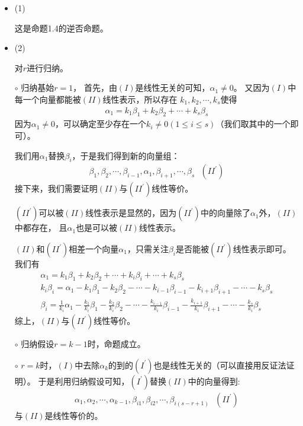 \documentclass{article}
\begin{document}
\begin{itemize}
  \item (1)

        这是命题1.4的逆否命题。
  \item (2)

        对$r$进行归纳。

        $\circ$ 归纳基始$r = 1$，
        首先，由$(I)$是线性无关的可知，$\alpha_1 \neq 0$。
        又因为$(I)$中每一个向量都能被$(II)$线性表示，所以存在
        $k_1, k_2, \cdots, k_s$使得
        \begin{align*}
          \alpha_1 = k_1 \beta_1 + k_2 \beta_2 + \cdots + k_s \beta_s
        \end{align*}
        因为$\alpha_1 \neq 0$，可以确定至少存在一个$k_i \neq 0 (1 \leq i \leq s)$（我们取其中的一个即可）。

        我们用$\alpha_1$替换$\beta_i$，于是我们得到新的向量组：
        \begin{align*}
          \beta_1, \beta_2, \cdots, \beta_{i-1}, \alpha_1, \beta_{i+1}, \cdots, \beta_s \ \ \ (II^\prime)
        \end{align*}
        接下来，我们需要证明$(II)$与$(II^\prime)$线性等价。

        $(II^\prime)$可以被$(II)$线性表示是显然的，因为$(II^\prime)$中的向量除了$\alpha_1$外，$(II)$中都存在，
        且$\alpha_1$也是可以被$(II)$线性表示。

        $(II)$和$(II^\prime)$相差一个向量$\alpha_1$，只需关注$\beta_i$是否能被$(II^\prime)$线性表示即可。
        我们有
        \begin{align*}
          \alpha_1 = k_1 \beta_1 + k_2 \beta_2 + \cdots + k_i \beta_i + \cdots + k_s \beta_s                                             \\
          k_i \beta_i = \alpha_1 - k_1 \beta_1 - k_2 \beta_2 - \cdots - k_{i-1} \beta_{i-1} - k_{i+1} \beta_{i+1} - \cdots - k_s \beta_s \\
          \beta_i = \frac{1}{k_i}\alpha_1 - \frac{k_1}{k_i} \beta_1 - \frac{k_2}{k_i} \beta_2 - \cdots - \frac{k_{i-1}}{k_i} \beta_{i-1} - \frac{k_{i+1}}{k_i} \beta_{i+1} - \cdots - \frac{k_s}{k_i} \beta_s
        \end{align*}
        综上，$(II)$与$(II^\prime)$线性等价。

        $\circ$ 归纳假设$r = k - 1$时，命题成立。

        $\circ$ $r = k$时，$(I)$中去除$\alpha_k$的到的$(I^\prime)$也是线性无关的（可以直接用反证法证明）。
        于是利用归纳假设可知，$(I^\prime)$替换$(II)$中的向量得到:
        \begin{align*}
          \alpha_1, \alpha_2, \cdots, \alpha_{k - 1}, \beta_{i1}, \beta_{i2}, \cdots, \beta_{i(s - r + 1)} \ \ \ (II^\prime)
        \end{align*}
        与$(II)$是线性等价的。


\end{itemize}
\end{document}

